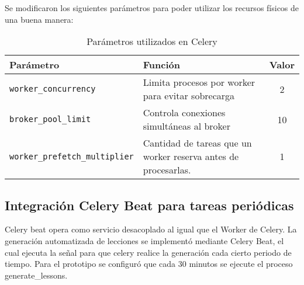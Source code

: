 Se modificaron los siguientes parámetros para poder utilizar los recursos físicos de una buena manera:

\begin{table}[H]
\begin{center}
\begin{tabular}{|l|p{5cm}|c|}
\hline
\textbf{Parámetro} & \textbf{Función} & \textbf{Valor} \\ \hline
\texttt{worker\_concurrency} & Limita procesos por worker para evitar sobrecarga & 2 \\ \hline
\texttt{broker\_pool\_limit} & Controla conexiones simultáneas al broker & 10 \\ \hline
\texttt{worker\_prefetch\_multiplier} & Cantidad de tareas que un worker reserva antes de procesarlas. & 1 \\ \hline
\end{tabular}
  \caption{Parámetros utilizados en Celery}
  \label{fig:tablero}
\end{center}
\end{table}



\subsection{Integración Celery Beat para tareas periódicas}
Celery beat opera como servicio desacoplado al igual que el Worker de Celery. La generación automatizada de lecciones se implementó mediante Celery Beat, el cual ejecuta la señal para que celery realice la generación cada cierto periodo de tiempo. Para el prototipo se configuró que cada 30 minutos se ejecute el proceso generate\_lessons.
